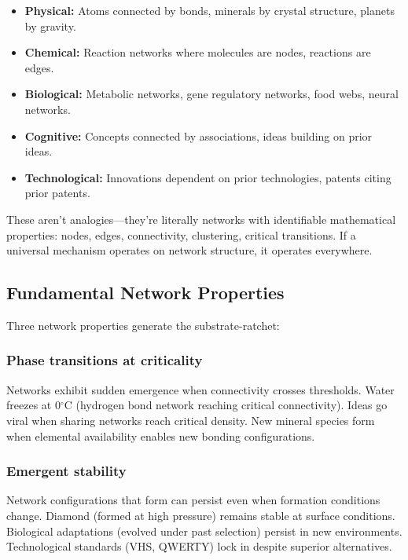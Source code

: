 \documentclass[12pt,a4paper]{article}
\begin{document}
\begin{itemize}
    \item \textbf{Physical:} Atoms connected by bonds, minerals by crystal structure, planets by gravity.
    \item \textbf{Chemical:} Reaction networks where molecules are nodes, reactions are edges.
    \item \textbf{Biological:} Metabolic networks, gene regulatory networks, food webs, neural networks.
    \item \textbf{Cognitive:} Concepts connected by associations, ideas building on prior ideas.
    \item \textbf{Technological:} Innovations dependent on prior technologies, patents citing prior patents.
\end{itemize}

These aren't analogies---they're literally networks with identifiable mathematical properties: nodes, edges, connectivity, clustering, critical transitions. If a universal mechanism operates on network structure, it operates everywhere.

\subsection{Fundamental Network Properties}

Three network properties generate the substrate-ratchet:

\subsubsection{Phase transitions at criticality}

Networks exhibit sudden emergence when connectivity crosses thresholds. Water freezes at 0\(^\circ\)C (hydrogen bond network reaching critical connectivity). Ideas go viral when sharing networks reach critical density. New mineral species form when elemental availability enables new bonding configurations.

\subsubsection{Emergent stability}

Network configurations that form can persist even when formation conditions change. Diamond (formed at high pressure) remains stable at surface conditions. Biological adaptations (evolved under past selection) persist in new environments. Technological standards (VHS, QWERTY) lock in despite superior alternatives.
\end{document}
